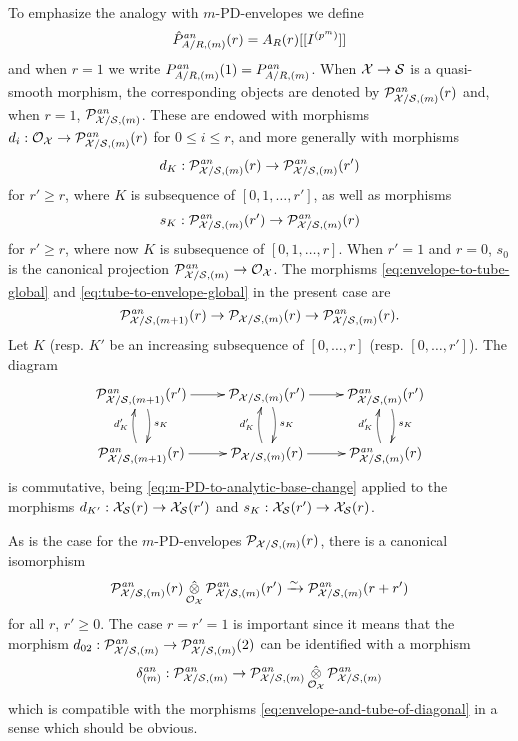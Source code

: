 \documentclass{article}
\theoremstyle{change}
\numberwithin{equation}{subsubsection}
\begin{document}
To emphasize the analogy with $m$-PD-envelopes we define
\begin{equation}
  \label{eq:analytic-Pm}
  \hat P^{\mathit{an}}_{A/R,(m)}(r)=A_R(r)[[{I}^{({p^m})}]]
\end{equation}
and when $r=1$ we write $P^{\mathit{an}}_{A/R,(m)}(1)=P^{\mathit{an}}_{A/R,(m)}$. When
${\cal X}\to{\cal S}$ is a quasi-smooth morphism, the corresponding objects are
denoted by ${\cal P}^{\mathit{an}}_{{\cal X}/{\cal S},(m)}(r)$ and, when $r=1$,
${\cal P}^{\mathit{an}}_{{\cal X}/{\cal S},(m)}$. These are endowed with morphisms
$d_i:{\cal O}_{\cal X}\to{\cal P}^{\mathit{an}}_{{\cal X}/{\cal S},(m)}(r)$ for $0\le i\le r$, and more
generally with morphisms
\begin{displaymath}
  d_K:{\cal P}^{\mathit{an}}_{{\cal X}/{\cal S},(m)}(r)\to{\cal P}^{\mathit{an}}_{{\cal X}/{\cal S},(m)}(r')
\end{displaymath}
for $r'\ge r$, where $K$ is subsequence of $[0,1,\ldots,r']$, as well
as morphisms
\begin{displaymath}
  s_K:{\cal P}^{\mathit{an}}_{{\cal X}/{\cal S},(m)}(r')\to{\cal P}^{\mathit{an}}_{{\cal X}/{\cal S},(m)}(r)
\end{displaymath}
for $r'\ge r$, where now $K$ is subsequence of $[0,1,\ldots,r]$. When
$r'=1$ and $r=0$, $s_0$ is the canonical projection
${\cal P}^{\mathit{an}}_{{\cal X}/{\cal S},(m)}\to{\cal O}_{\cal X}$. The morphisms
\ref{eq:envelope-to-tube-global} and \ref{eq:tube-to-envelope-global}
in the present case are
\begin{equation}
  \label{eq:envelope-and-tube-of-diagonal}
  {\cal P}^{\mathit{an}}_{{\cal X}/{\cal S},(m+1)}(r)\to{\cal P}_{{\cal X}/{\cal S},(m)}(r)\to{\cal P}^{\mathit{an}}_{{\cal X}/{\cal S},(m)}(r).
\end{equation}
Let $K$ (resp. $K'$ be an increasing subsequence of $[0,\ldots,r]$
(resp. $[0,\ldots,r']$). The diagram
\begin{equation}
  \label{eq:envelope-and-tube-of-diagonal-morphisms}
  \xymatrix{
    \cP^\an_{\cX/\cS,(m+1)}(r')\ar[r]\ar@/^/[d]^{s_K}
    &\cP_{\cX/\cS,(m)}(r')\ar[r]\ar@/^/[d]^{s_K}
    &\cP^\an_{\cX/\cS,(m)}(r')\ar@/^/[d]^{s_K}\\
    \cP^\an_{\cX/\cS,(m+1)}(r)\ar[r]\ar@/^/[u]^{d_K'}
    &\cP_{\cX/\cS,(m)}(r)\ar[r]\ar@/^/[u]^{d_K'}
    &\cP^\an_{\cX/\cS,(m)}(r)\ar@/^/[u]^{d_K'}
  }
\end{equation}
is commutative, being \ref{eq:m-PD-to-analytic-base-change} applied to
the morphisms $d_{K'}:{\cal X}_{\cal S}(r)\to{\cal X}_{\cal S}(r')$ and
$s_K:{\cal X}_{\cal S}(r')\to{\cal X}_{\cal S}(r)$.

As is the case for the $m$-PD-envelopes ${\cal P}_{{\cal X}/{\cal S},(m)}(r)$, there
is a canonical isomorphism
\begin{displaymath}
  {\cal P}^{\mathit{an}}_{{\cal X}/{\cal S},(m)}(r)\mathop{\hat\otimes}_{{\cal O}_{\cal X}}{\cal P}^{\mathit{an}}_{{\cal X}/{\cal S},(m)}(r')
  \xrightarrow{\sim}{\cal P}^{\mathit{an}}_{{\cal X}/{\cal S},(m)}(r+r')  
\end{displaymath}
for all $r$, $r'\ge0$. The case $r=r'=1$ is important since it means
that the morphism
$d_{02}:{\cal P}^{\mathit{an}}_{{\cal X}/{\cal S},(m)}\to{\cal P}^{\mathit{an}}_{{\cal X}/{\cal S},(m)}(2)$ can be
identified with a morphism
\begin{equation}
  \label{eq:analytic-delta}
  \delta^{\mathit{an}}_{(m)}:{\cal P}^{\mathit{an}}_{{\cal X}/{\cal S},(m)}\to
  {\cal P}^{\mathit{an}}_{{\cal X}/{\cal S},(m)}\mathop{\hat\otimes}_{{\cal O}_{\cal X}}{\cal P}^{\mathit{an}}_{{\cal X}/{\cal S},(m)}
\end{equation}
which is compatible with the morphisms
\ref{eq:envelope-and-tube-of-diagonal} in a sense which should be
obvious. 
\end{document}
